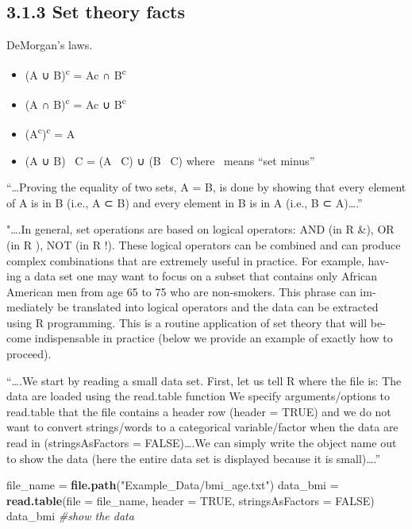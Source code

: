 \documentclass[]{article}
\newenvironment{Shaded}{\begin{snugshade}}{\end{snugshade}}
\newcommand{\CommentTok}[1]{\textcolor[rgb]{0.56,0.35,0.01}{\textit{#1}}}
\newcommand{\DataTypeTok}[1]{\textcolor[rgb]{0.13,0.29,0.53}{#1}}
\newcommand{\KeywordTok}[1]{\textcolor[rgb]{0.13,0.29,0.53}{\textbf{#1}}}
\newcommand{\NormalTok}[1]{#1}
\newcommand{\OtherTok}[1]{\textcolor[rgb]{0.56,0.35,0.01}{#1}}
\newcommand{\StringTok}[1]{\textcolor[rgb]{0.31,0.60,0.02}{#1}}
\providecommand{\tightlist}{%
  \setlength{\itemsep}{0pt}\setlength{\parskip}{0pt}}
\begin{document}
\hypertarget{set-theory-facts}{%
\subsection{3.1.3 Set theory facts}\label{set-theory-facts}}

DeMorgan's laws.

\begin{itemize}
\tightlist
\item
  (A ∪ B)\textsuperscript{c} = Ac ∩ B\textsuperscript{c}
\item
  (A ∩ B)\textsuperscript{c} = Ac ∪ B\textsuperscript{c}
\item
  (A\textsuperscript{c})\textsuperscript{c} = A
\item
  (A ∪ B) ~C = (A ~C) ∪ (B ~C) where ~means ``set minus''
\end{itemize}

``\ldots{}Proving the equality of two sets, A = B, is done by showing
that every element of A is in B (i.e., A ⊂ B) and every element in B is
in A (i.e., B ⊂ A)\ldots{}.''

"\ldots{}.In general, set operations are based on logical operators: AND
(in R \&), OR (in R \textbar{} ), NOT (in R !). These logical operators
can be combined and can produce complex combinations that are extremely
useful in practice. For example, hav- ing a data set one may want to
focus on a subset that contains only African American men from age 65 to
75 who are non-smokers. This phrase can im- mediately be translated into
logical operators and the data can be extracted using R programming.
This is a routine application of set theory that will be- come
indispensable in practice (below we provide an example of exactly how to
proceed).

``\ldots{}.We start by reading a small data set. First, let us tell R
where the file is: The data are loaded using the read.table function We
specify arguments/options to read.table that the file contains a header
row (header = TRUE) and we do not want to convert strings/words to a
categorical variable/factor when the data are read in (stringsAsFactors
= FALSE)\ldots{}.We can simply write the object name out to show the
data (here the entire data set is displayed because it is
small)\ldots{}.''

\begin{Shaded}
\begin{Highlighting}[]
\NormalTok{file_name =}\StringTok{ }\KeywordTok{file.path}\NormalTok{(}\StringTok{"Example_Data/bmi_age.txt"}\NormalTok{)}
\NormalTok{data_bmi =}\StringTok{ }\KeywordTok{read.table}\NormalTok{(}\DataTypeTok{file =}\NormalTok{ file_name, }\DataTypeTok{header =} \OtherTok{TRUE}\NormalTok{, }\DataTypeTok{stringsAsFactors =} \OtherTok{FALSE}\NormalTok{)}
\NormalTok{data_bmi }\CommentTok{#show the data}
\end{Highlighting}
\end{Shaded}
\end{document}
